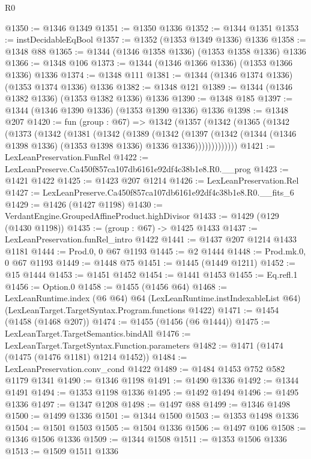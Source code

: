 \begin{lexlean}{R0}
\begin{coremodule}
@1350 := @1346 @1349
@1351 := @1350 @1336
@1352 := @1344 @1351
@1353 := instDecidableEqBool
@1357 := @1352 (@1353 @1349 @1336) @1336
@1358 := @1348 @88
@1365 := @1344 (@1346 @1358 @1336) (@1353 @1358 @1336) @1336
@1366 := @1348 @106
@1373 := @1344 (@1346 @1366 @1336) (@1353 @1366 @1336) @1336
@1374 := @1348 @111
@1381 := @1344 (@1346 @1374 @1336) (@1353 @1374 @1336) @1336
@1382 := @1348 @121
@1389 := @1344 (@1346 @1382 @1336) (@1353 @1382 @1336) @1336
@1390 := @1348 @185
@1397 := @1344 (@1346 @1390 @1336) (@1353 @1390 @1336) @1336
@1398 := @1348 @207
@1420 := fun (group : @67) =>
  @1342
    (@1357
      (@1342
        (@1365
          (@1342
            (@1373
              (@1342
                (@1381
                  (@1342
                    (@1389
                      (@1342
                        (@1397
                          (@1342
                            (@1344 (@1346 @1398 @1336) (@1353 @1398 @1336) @1336 @1336)))))))))))))
@1421 := LexLeanPreservation.FunRel
@1422 := LexLeanPreserve.Ca450f857ca107db6161e92df4c38b1e8.R0.__prog
@1423 := @1421 @1422
@1425 := @1423 @207 @1214
@1426 := LexLeanPreservation.Rel
@1427 := LexLeanPreserve.Ca450f857ca107db6161e92df4c38b1e8.R0.__fits_6
@1429 := @1426 (@1427 @1198)
@1430 := VerdantEngine.GroupedAffineProduct.highDivisor
@1433 := @1429 (@129 (@1430 @1198))
@1435 := (group : @67) -> @1425 @1433
@1437 := LexLeanPreservation.funRel_intro @1422
@1441 := @1437 @207 @1214 @1433 @1181
@1444 := Prod.{0, 0} @67 @1193
@1445 := @2 @1444
@1448 := Prod.mk.{0, 0} @67 @1193
@1449 := @1448 @75
@1451 := @1445 (@1449 @1211)
@1452 := @15 @1444
@1453 := @1451 @1452
@1454 := @1441 @1453
@1455 := Eq.refl.{1}
@1456 := Option.{0}
@1458 := @1455 (@1456 @64)
@1468 := LexLeanRuntime.index
    (@6 @64)
    @64
    (LexLeanRuntime.instIndexableList @64)
    (LexLeanTarget.TargetSyntax.Program.functions @1422)
@1471 := @1454 (@1458 (@1468 @207))
@1474 := @1455 (@1456 (@6 @1444))
@1475 := LexLeanTarget.TargetSemantics.bindAll
@1476 := LexLeanTarget.TargetSyntax.Function.parameters
@1482 := @1471 (@1474 (@1475 (@1476 @1181) @1214 @1452))
@1484 := LexLeanPreservation.conv_cond @1422
@1489 := @1484 @1453 @752 @582 @1179 @1341
@1490 := @1346 @1198
@1491 := @1490 @1336
@1492 := @1344 @1491
@1494 := @1353 @1198 @1336
@1495 := @1492 @1494
@1496 := @1495 @1336
@1497 := @1347 @1208
@1498 := @1497 @88
@1499 := @1346 @1498
@1500 := @1499 @1336
@1501 := @1344 @1500
@1503 := @1353 @1498 @1336
@1504 := @1501 @1503
@1505 := @1504 @1336
@1506 := @1497 @106
@1508 := @1346 @1506 @1336
@1509 := @1344 @1508
@1511 := @1353 @1506 @1336
@1513 := @1509 @1511 @1336

\end{coremodule}
\end{lexlean}
